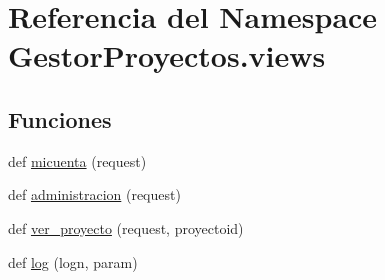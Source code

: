 \hypertarget{namespace_gestor_proyectos_1_1views}{}\section{Referencia del Namespace Gestor\+Proyectos.\+views}
\label{namespace_gestor_proyectos_1_1views}
\subsection*{Funciones}
\begin{DoxyCompactItemize}
\item 
def \hyperlink{namespace_gestor_proyectos_1_1views_a671cec562be9ce33c1c31ce07b87e1a5}{micuenta} (request)
\item 
def \hyperlink{namespace_gestor_proyectos_1_1views_a9bd9a94bcd3bc4e604983316886fa258}{administracion} (request)
\item 
def \hyperlink{namespace_gestor_proyectos_1_1views_a5f217f95aac471a241cd18c4a37ab530}{ver\+\_\+proyecto} (request, proyectoid)
\item 
def \hyperlink{namespace_gestor_proyectos_1_1views_ae07a1c4b3369bfac08470cb2b59ac6cc}{log} (logn, param)
\end{DoxyCompactItemize}
